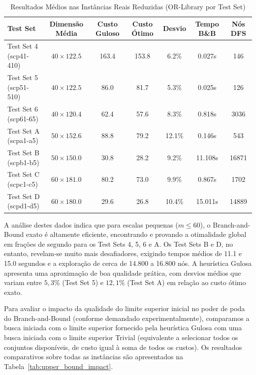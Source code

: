 \documentclass[conference]{IEEEtran}
\begin{document}
\begin{table}[htbp]
\caption{Resultados Médios nas Instâncias Reais Reduzidas (OR-Library por Test Set)}
\label{tab:real_small_summary}
\begin{center}
\begin{tabular}{lcccccc}
\toprule
\textbf{Test Set} & \textbf{Dimensão Média} & \textbf{Custo Guloso} & \textbf{Custo Ótimo} & \textbf{Desvio} & \textbf{Tempo B\&B} & \textbf{Nós DFS} \\
\midrule
Test Set 4 (scp41-410) & $40 \times 122.5$ & 163.4 & 153.8 & 6.2\% & 0.027s & 146 \\
Test Set 5 (scp51-510) & $40 \times 122.5$ & 86.0 & 81.7 & 5.3\% & 0.025s & 126 \\
Test Set 6 (scp61-65) & $40 \times 120.4$ & 62.4 & 57.6 & 8.3\% & 0.818s & 3036 \\
Test Set A (scpa1-a5) & $50 \times 152.6$ & 88.8 & 79.2 & 12.1\% & 0.146s & 543 \\
Test Set B (scpb1-b5) & $50 \times 150.0$ & 30.8 & 28.2 & 9.2\% & 11.108s & 16871 \\
Test Set C (scpc1-c5) & $60 \times 181.0$ & 80.2 & 73.0 & 9.9\% & 0.867s & 1702 \\
Test Set D (scpd1-d5) & $60 \times 180.0$ & 29.6 & 26.8 & 10.4\% & 15.011s & 14889 \\
\bottomrule
\end{tabular}
\end{center}
\end{table}

A análise destes dados indica que para escalas pequenas ($m \le 60$), o Branch-and-Bound exato é altamente eficiente, encontrando e provando a otimalidade global em frações de segundo para os Test Sets 4, 5, 6 e A. Os Test Sets B e D, no entanto, revelam-se muito mais desafiadores, exigindo tempos médios de 11.1 e 15.0 segundos e a exploração de cerca de 14.800 a 16.800 nós. A heurística Gulosa apresenta uma aproximação de boa qualidade prática, com desvios médios que variam entre $5{,}3\%$ (Test Set 5) e $12{,}1\%$ (Test Set A) em relação ao custo ótimo exato.

Para avaliar o impacto da qualidade do limite superior inicial no poder de poda do Branch-and-Bound (conforme demandado experimentalmente), comparamos a busca iniciada com o limite superior fornecido pela heurística Gulosa com uma busca iniciada com o limite superior Trivial (equivalente a selecionar todos os conjuntos disponíveis, de custo igual à soma de todos os custos). Os resultados comparativos sobre todas as instâncias são apresentados na Tabela~\ref{tab:upper_bound_impact}.
\end{document}
